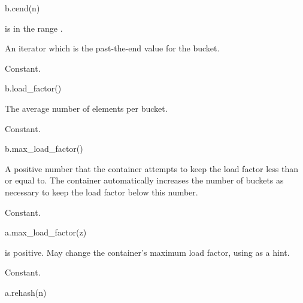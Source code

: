 %
\begin{itemdecl}
b.cend(n)
\end{itemdecl}

\begin{itemdescr}
\pnum
\result
{}

\pnum
\expects
{} is in the range .

\pnum
\returns
An iterator which is the past-the-end value for the bucket.

\pnum
\complexity
Constant.
\end{itemdescr}

%
\begin{itemdecl}
b.load_factor()
\end{itemdecl}

\begin{itemdescr}
\pnum
\result
{}

\pnum
\returns
The average number of elements per bucket.

\pnum
\complexity
Constant.
\end{itemdescr}

%
\begin{itemdecl}
b.max_load_factor()
\end{itemdecl}

\begin{itemdescr}
\pnum
\result
{}

\pnum
\returns
A positive number
that the container attempts to keep the load factor less than or equal to.
The container automatically increases the number of buckets as necessary
to keep the load factor below this number.

\pnum
\complexity
Constant.
\end{itemdescr}

%
\begin{itemdecl}
a.max_load_factor(z)
\end{itemdecl}

\begin{itemdescr}
\pnum
\result
{}

\pnum
\expects
{} is positive.
May change the container's maximum load factor, using  as a hint.

\pnum
\complexity
Constant.
\end{itemdescr}

%
\begin{itemdecl}
a.rehash(n)
\end{itemdecl}

